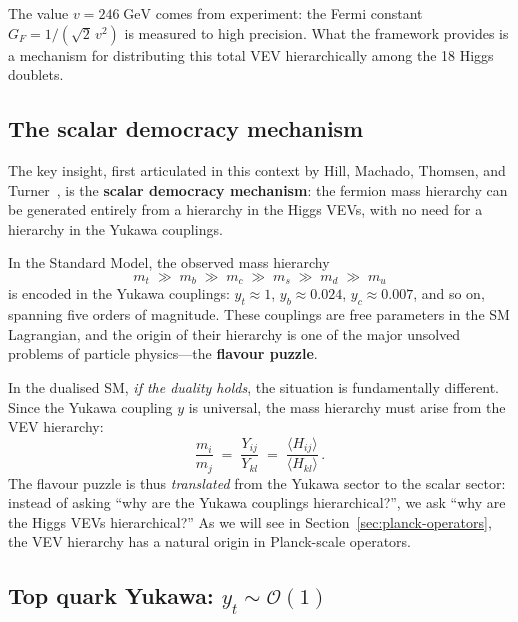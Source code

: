 \documentclass[11pt,a4paper]{article}
\begin{document}
\begin{remark}
  The value $v = 246\;\text{GeV}$ comes from experiment: the Fermi
  constant $G_F = 1/(\sqrt{2}\, v^2)$ is measured to high precision.
  What the framework provides is a mechanism for distributing this
  total VEV hierarchically among the 18 Higgs doublets.
\end{remark}

\subsection{The scalar democracy mechanism}

The key insight, first articulated in this context by Hill, Machado,
Thomsen, and Turner~\cite{HillMachado2019}, is the \textbf{scalar
democracy mechanism}: the fermion mass hierarchy can be generated
entirely from a hierarchy in the Higgs VEVs, with no need for a
hierarchy in the Yukawa couplings.

In the Standard Model, the observed mass hierarchy
\begin{equation}\label{eq:mass-hierarchy}
  m_t \;\gg\; m_b \;\gg\; m_c \;\gg\; m_s \;\gg\; m_d \;\gg\; m_u
\end{equation}
is encoded in the Yukawa couplings: $y_t \approx 1$,
$y_b \approx 0.024$, $y_c \approx 0.007$, and so on, spanning five
orders of magnitude.  These couplings are free parameters in the SM
Lagrangian, and the origin of their hierarchy is one of the major
unsolved problems of particle physics---the \textbf{flavour puzzle}.

In the dualised SM, \emph{if the duality holds}, the situation is
fundamentally different.  Since the Yukawa coupling $y$ is universal,
the mass hierarchy must arise from the VEV hierarchy:
\begin{equation}\label{eq:mass-from-vev}
  \frac{m_i}{m_j}
  \;=\; \frac{Y_{ij}}{Y_{kl}}
  \;=\; \frac{\langle H_{ij} \rangle}{\langle H_{kl} \rangle}\,.
\end{equation}
The flavour puzzle is thus \emph{translated} from the Yukawa sector to
the scalar sector: instead of asking ``why are the Yukawa couplings
hierarchical?'', we ask ``why are the Higgs VEVs hierarchical?''  As we
will see in Section~\ref{sec:planck-operators}, the VEV hierarchy has a
natural origin in Planck-scale operators.

\subsection{Top quark Yukawa: $y_t \sim \mathcal{O}(1)$}
\end{document}

